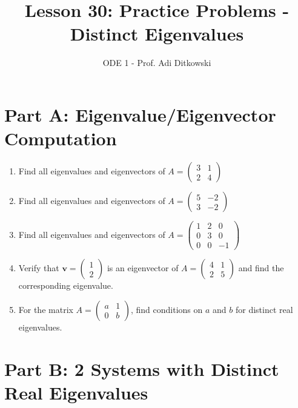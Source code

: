 \documentclass[12pt]{article}
\title{Lesson 30: Practice Problems - Distinct Eigenvalues}
\author{ODE 1 - Prof. Adi Ditkowski}
\date{}
\begin{document}
\maketitle

\section*{Part A: Eigenvalue/Eigenvector Computation}

\begin{enumerate}
\item Find all eigenvalues and eigenvectors of $A = \begin{pmatrix} 3 & 1 \\ 2 & 4 \end{pmatrix}$

\item Find all eigenvalues and eigenvectors of $A = \begin{pmatrix} 5 & -2 \\ 3 & -2 \end{pmatrix}$

\item Find all eigenvalues and eigenvectors of $A = \begin{pmatrix} 1 & 2 & 0 \\ 0 & 3 & 0 \\ 0 & 0 & -1 \end{pmatrix}$

\item Verify that $\mathbf{v} = \begin{pmatrix} 1 \\ 2 \end{pmatrix}$ is an eigenvector of $A = \begin{pmatrix} 4 & 1 \\ 2 & 5 \end{pmatrix}$ and find the corresponding eigenvalue.

\item For the matrix $A = \begin{pmatrix} a & 1 \\ 0 & b \end{pmatrix}$, find conditions on $a$ and $b$ for distinct real eigenvalues.
\end{enumerate}

\section*{Part B: 2 Systems with Distinct Real Eigenvalues}
\end{document}

